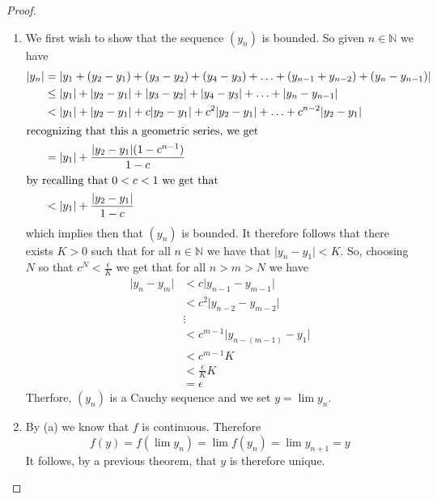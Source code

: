 \begin{enumerate}
\begin{proof}
\begin{enumerate}
            \item We first wish to show that the sequence \( (y_{n}) \) is bounded. So given \( n \in \mathbb{N} \) we have
            \begin{align*}
                \vert y_{n} \vert &= \vert y_{1} + (y_{2}-y_{1}) + (y_{3}-y_{2}) + (y_{4}-y_{3}) + \ldots + (y_{n-1}+y_{n-2}) + (y_{n}-y_{n-1}) \vert \\
                &\leq \vert y_{1} \vert + \vert y_{2}-y_{1} \vert + \vert y_{3}-y_{2} \vert + \vert y_{4}-y_{3} \vert + \ldots + \vert y_{n}-y_{n-1} \vert \\
                &< \vert y_{1} \vert + \vert y_{2} - y_{1} \vert + c \vert y_{2}-y_{1} \vert + c^{2} \vert y_{2} - y_{1} \vert + \ldots + c^{n-2} \vert y_{2}-y_{1} \vert \\
                \intertext{recognizing that this a geometric series, we get}
                &= \vert y_{1} \vert + \frac{\vert y_{2} - y_{1} \vert(1-c^{n-1})}{1-c} \\
                \intertext{by recalling that \( 0 < c < 1 \) we get that}
                &< \vert y_{1} \vert + \frac{\vert y_{2}-y_{1} \vert}{1-c}
            \end{align*}
            which implies then that \( (y_{n}) \) is bounded. It therefore follows that there exists \( K > 0 \) such that for all \( n \in \mathbb{N} \) we have that \( \vert y_{n} - y_{1} \vert < K \). So, choosing \( N \) so that \( c^{N} < \frac{\epsilon}{K} \) we get that for all \( n > m > N \) we have
            \begin{align*}
                \vert y_{n} - y_{m} \vert &< c \vert y_{n-1} - y_{m-1} \vert \\
                &< c^{2} \vert y_{n-2} - y_{m-2} \vert \\
                &\vdots \\
                &<c^{m-1} \vert y_{n-(m-1)} - y_{1} \vert \\
                &< c^{m-1} K \\
                &< \frac{\epsilon}{K}K \\
                &= \epsilon
            \end{align*}
            Therfore, \( (y_{n}) \) is a Cauchy sequence and we set \( y = \lim y_{n} \). 
            
            \item By (a) we know that \( f \) is continuous. Therefore
            \[
            f(y) = f(\lim y_{n}) = \lim f(y_{n}) = \lim y_{n+1} = y
            \]
            It follows, by a previous theorem, that \( y \) is therefore unique.
            

\end{enumerate}
\end{proof}
\end{enumerate}
